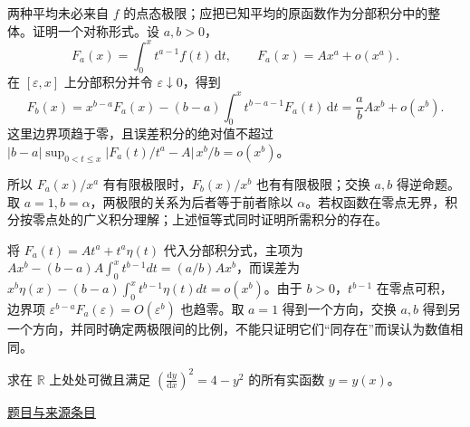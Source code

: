 \documentclass[12pt,fontset=fandol]{ctexart}
\begin{document}
\begin{solve}\label{ans:fin14-low:9}

两种平均未必来自 $f$ 的点态极限；应把已知平均的原函数作为分部积分中的整体。证明一个对称形式。设 $a,b>0$，
\[
F_a(x)=\int_0^xt^{a-1}f(t)\,\mathrm dt,
\qquad F_a(x)=Ax^a+o(x^a).
\]
在 $[\varepsilon,x]$ 上分部积分并令 $\varepsilon\downarrow0$，得到
\[
F_b(x)=x^{b-a}F_a(x)-(b-a)\int_0^xt^{b-a-1}F_a(t)\,\mathrm dt
=\frac abAx^b+o(x^b).
\]
这里边界项趋于零，且误差积分的绝对值不超过
$|b-a|\sup_{0<t\le x}|F_a(t)/t^a-A|\,x^b/b=o(x^b)$。

所以 $F_a(x)/x^a$ 有有限极限时，$F_b(x)/x^b$ 也有有限极限；交换 $a,b$ 得逆命题。取 $a=1,b=\alpha$，两极限的关系为后者等于前者除以 $\alpha$。若权函数在零点无界，积分按零点处的广义积分理解；上述恒等式同时证明所需积分的存在。

将 $F_a(t)=At^a+t^a\eta(t)$ 代入分部积分式，主项为 $Ax^b-(b-a)A\int_0^xt^{b-1}dt=(a/b)Ax^b$，而误差为 $x^b\eta(x)-(b-a)\int_0^xt^{b-1}\eta(t)dt=o(x^b)$。由于 $b>0$，$t^{b-1}$ 在零点可积，边界项 $\varepsilon^{b-a}F_a(\varepsilon)=O(\varepsilon^b)$ 也趋零。取 $a=1$ 得到一个方向，交换 $a,b$ 得到另一个方向，并同时确定两极限间的比例，不能只证明它们“同存在”而误认为数值相同。

\end{solve}

\begin{example}\label{ex:fin14-low:10}\label{pr:fin14-low:10}

求在 $\mathbb{R}$ 上处处可微且满足 $\left( \frac{\mathrm{d}y}{\mathrm{d}x} \right)^2 = 4 - y^2$ 的所有实函数 $y = y(x)$。

\par\href{https://github.com/lzxcr/cmc-mathematics/blob/64916fa1fdbc3e444a652eca204d5669058ee321/src/problems/finals/14/12.md}{题目与来源条目}

\end{example}
\end{document}
